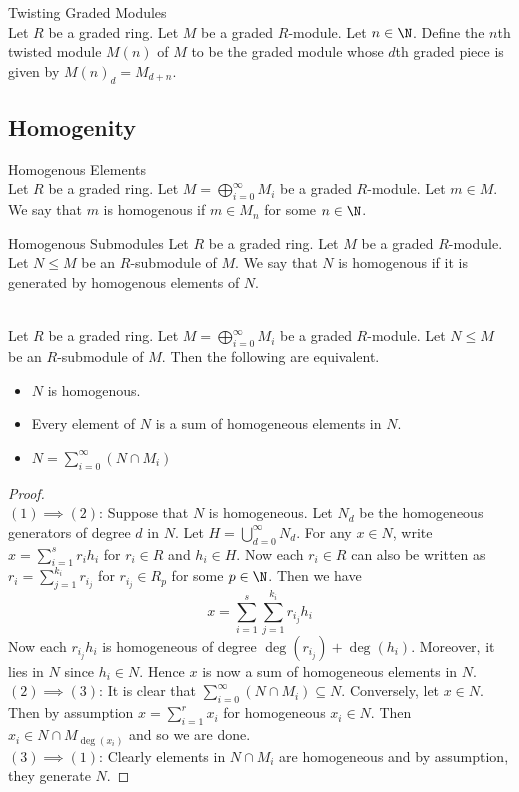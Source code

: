 \documentclass[a4paper]{article}
\begin{document}
\begin{defn}{Twisting Graded Modules}{}\\
Let $R$ be a graded ring. Let $M$ be a graded $R$-module. Let $n\in\N$. Define the $n$th twisted module $M(n)$ of $M$ to be the graded module whose $d$th graded piece is given by $M(n)_d=M_{d+n}$. 
\end{defn}

\subsection{Homogenity}
\begin{defn}{Homogenous Elements}{}\\
Let $R$ be a graded ring. Let $M=\bigoplus_{i=0}^\infty M_i$ be a graded $R$-module. Let $m\in M$. We say that $m$ is homogenous if $m\in M_n$ for some $n\in\N$. 
\end{defn}

\begin{defn}{Homogenous Submodules}{} Let $R$ be a graded ring. Let $M$ be a graded $R$-module. Let $N\leq M$ be an $R$-submodule of $M$. We say that $N$ is homogenous if it is generated by homogenous elements of $N$. 
\end{defn}

\begin{lmm}{}{}\\ Let $R$ be a graded ring. Let $M=\bigoplus_{i=0}^\infty M_i$ be a graded $R$-module. Let $N\leq M$ be an $R$-submodule of $M$. Then the following are equivalent. 
\begin{itemize}
\item $N$ is homogenous. 
\item Every element of $N$ is a sum of homogeneous elements in $N$. 
\item $N=\sum_{i=0}^\infty(N\cap M_i)$
\end{itemize}
\begin{proof}\\
$(1)\implies(2)$: Suppose that $N$ is homogeneous. Let $N_d$ be the homogeneous generators of degree $d$ in $N$. Let $H=\bigcup_{d=0}^\infty N_d$. For any $x\in N$, write $x=\sum_{i=1}^sr_ih_i$ for $r_i\in R$ and $h_i\in H$. Now each $r_i\in R$ can also be written as $r_i=\sum_{j=1}^{k_i}r_{i_j}$ for $r_{i_j}\in R_p$ for some $p\in\N$. Then we have $$x=\sum_{i=1}^s\sum_{j=1}^{k_i}r_{i_j}h_i$$ Now each $r_{i_j}h_i$ is homogeneous of degree $\deg(r_{i_j})+\deg(h_i)$. Moreover, it lies in $N$ since $h_i\in N$. Hence $x$ is now a sum of homogeneous elements in $N$. \\

$(2)\implies (3)$: It is clear that $\sum_{i=0}^\infty(N\cap M_i)\subseteq N$. Conversely, let $x\in N$. Then by assumption $x=\sum_{i=1}^rx_i$ for homogeneous $x_i\in N$. Then $x_i\in N\cap M_{\deg(x_i)}$ and so we are done. \\

$(3)\implies(1)$: Clearly elements in $N\cap M_i$ are homogeneous and by assumption, they generate $N$. 
\end{proof}
\end{lmm}
\end{document}
